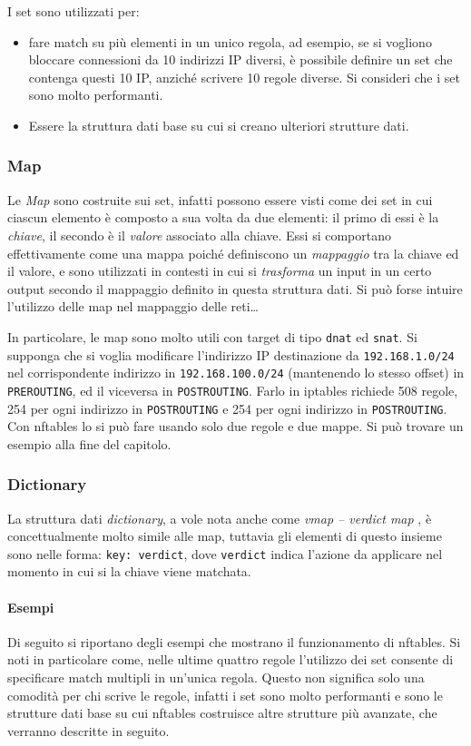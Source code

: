 I set sono utilizzati per:
\begin{itemize}
	\item fare match su più elementi in un unico regola, ad esempio, se si vogliono
	      bloccare connessioni da 10 indirizzi IP diversi, è possibile definire un set
	      che contenga questi 10 IP, anziché scrivere 10 regole diverse. Si consideri che
	      i set sono molto performanti.
	\item Essere la struttura dati base su cui si creano ulteriori strutture dati.
\end{itemize}


\subsubsection{Map}
Le \textit{Map} sono costruite sui set, infatti possono essere visti come dei set in cui
ciascun elemento è composto a sua volta da due elementi: il primo di essi
è la \textit{chiave}, il secondo è il \textit{valore} associato alla chiave. Essi
si comportano effettivamente come una mappa poiché definiscono un \textit{mappaggio}
tra la chiave ed il valore, e sono utilizzati in contesti in cui si \textit{trasforma}
un input in un certo output secondo il mappaggio definito in questa struttura dati.
Si può forse intuire l'utilizzo delle map nel mappaggio delle reti\ldots


In particolare, le map sono molto utili con target di tipo \texttt{dnat} ed \texttt{snat}.
Si supponga che si voglia modificare l'indirizzo IP destinazione da \texttt{192.168.1.0/24}
nel corrispondente indirizzo in \texttt{192.168.100.0/24} (mantenendo lo stesso
offset) in \texttt{PREROUTING}, ed il viceversa in \texttt{POSTROUTING}. Farlo in iptables
richiede 508 regole, 254 per ogni indirizzo in
\texttt{POSTROUTING} e 254 per ogni indirizzo in \texttt{POSTROUTING}. Con nftables
lo si può fare usando solo due regole e due mappe. Si può trovare un esempio alla fine del
capitolo.


\subsubsection{Dictionary}
La struttura dati \textit{dictionary}, a vole nota anche come \textit{vmap -- verdict map}
, è concettualmente
molto simile alle map, tuttavia gli elementi di questo insieme sono nelle forma:
\texttt{key: verdict}, dove \texttt{verdict} indica l'azione da applicare nel
momento in cui si la chiave viene
matchata.

\paragraph{Esempi}
Di seguito si riportano degli esempi che mostrano il funzionamento di nftables.
Si noti in particolare come, nelle ultime quattro regole l'utilizzo dei set
consente di specificare match multipli in un'unica regola. Questo non significa
solo una comodità per chi scrive le regole, infatti i set sono molto performanti
e sono le strutture dati base su cui nftables costruisce altre strutture
più avanzate, che verranno descritte in seguito.

